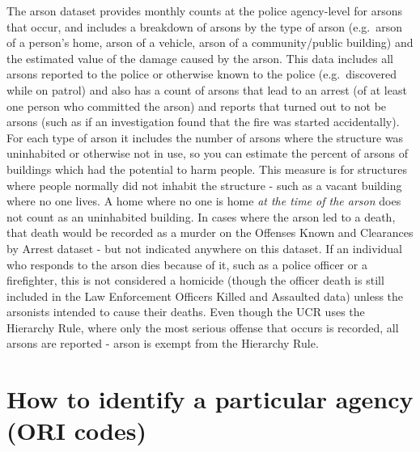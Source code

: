 \documentclass[
  12pt,
  openany]{book}
\begin{document}
The arson dataset provides monthly counts at the police agency-level for arsons that occur, and includes a breakdown of arsons by the type of arson (e.g.~arson of a person's home, arson of a vehicle, arson of a community/public building) and the estimated value of the damage caused by the arson. This data includes all arsons reported to the police or otherwise known to the police (e.g.~discovered while on patrol) and also has a count of arsons that lead to an arrest (of at least one person who committed the arson) and reports that turned out to not be arsons (such as if an investigation found that the fire was started accidentally). For each type of arson it includes the number of arsons where the structure was uninhabited or otherwise not in use, so you can estimate the percent of arsons of buildings which had the potential to harm people. This measure is for structures where people normally did not inhabit the structure - such as a vacant building where no one lives. A home where no one is home \emph{at the time of the arson} does not count as an uninhabited building. In cases where the arson led to a death, that death would be recorded as a murder on the Offenses Known and Clearances by Arrest dataset - but not indicated anywhere on this dataset. If an individual who responds to the arson dies because of it, such as a police officer or a firefighter, this is not considered a homicide (though the officer death is still included in the Law Enforcement Officers Killed and Assaulted data) unless the arsonists intended to cause their deaths. Even though the UCR uses the Hierarchy Rule, where only the most serious offense that occurs is recorded, all arsons are reported - arson is exempt from the Hierarchy Rule.

\hypertarget{how-to-identify-a-particular-agency-ori-codes}{%
\section{How to identify a particular agency (ORI codes)}\label{how-to-identify-a-particular-agency-ori-codes}}
\end{document}
